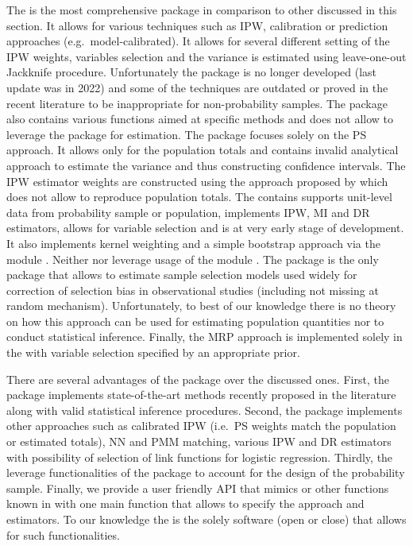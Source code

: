 \documentclass[
]{jss}
\begin{document}
The  is the most comprehensive package in comparison to
other discussed in this section. It allows for various techniques such
as IPW, calibration or prediction approaches (e.g.~model-calibrated). It
allows for several different setting of the IPW weights, variables
selection and the variance is estimated using leave-one-out Jackknife
procedure. Unfortunately the package is no longer developed (last update
was in 2022) and some of the techniques are outdated or proved in the
recent literature to be inappropriate for non-probability samples. The
package also contains various functions aimed at specific methods and
does not allow to leverage the  package for estimation. The
 package focuses solely on the PS approach. It allows only
for the population totals and contains invalid analytical approach to
estimate the variance and thus constructing confidence intervals. The
IPW estimator weights are constructed using the approach proposed by
\citet{Schonlau2017} which does not allow to reproduce population
totals. The  contains supports unit-level data from
probability sample or population, implements IPW, MI and DR estimators,
allows for variable selection and is at very early stage of development.
It also implements kernel weighting and a simple bootstrap approach via
the  module \citep{scipy2020}. Neither 
nor  leverage usage of the  module
\citep{Diallo2021}. The  package is the only package that
allows to estimate sample selection models used widely for correction of
selection bias in observational studies (including not missing at random
mechanism). Unfortunately, to best of our knowledge there is no theory
on how this approach can be used for estimating population quantities
nor to conduct statistical inference. Finally, the MRP approach is
implemented solely in the  with variable selection
specified by an appropriate prior.

There are several advantages of the  package over the
discussed ones. First, the package implements state-of-the-art methods
recently proposed in the literature along with valid statistical
inference procedures. Second, the package implements other approaches
such as calibrated IPW (i.e.~PS weights match the population or
estimated totals), NN and PMM matching, various IPW and DR estimators
with possibility of selection of link functions for logistic regression.
Thirdly, the  leverage functionalities of the
 package to account for the design of the probability
sample. Finally, we provide a user friendly API that mimics 
or other functions known in  with one main function that
allows to specify the approach and estimators. To our knowledge the
 is the solely software (open or close) that allows for
such functionalities.
\end{document}
